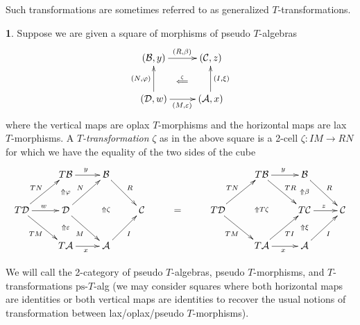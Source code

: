 \documentclass[a4paper,oneside,english]{amsart}
\numberwithin{equation}{section}
\numberwithin{figure}{section}
\theoremstyle{plain}
\theoremstyle{definition}
\newtheorem{defn}[thm]{\protect\definitionname}
\theoremstyle{remark}
\theoremstyle{definition}
\theoremstyle{plain}
\theoremstyle{plain}
\theoremstyle{plain}
\providecommand{\definitionname}{Definition}
\begin{document}
Such transformations are sometimes referred to as generalized $T$-transformations.
\begin{defn}
Suppose we are given a square of morphisms of pseudo $T$-algebras
\[
\xymatrix@=1em{\left(\mathcal{B},y\right)\ar[rr]^{\left(R,\beta\right)} &  & \left(\mathcal{C},z\right)\ar@{}[ldld]|-{\stackrel{\zeta}{\Longleftarrow}}\\
\\
\left(\mathcal{D},w\right)\ar[rr]_{\left(M,\varepsilon\right)}\ar[uu]^{\left(N,\varphi\right)} &  & \left(\mathcal{A},x\right)\ar[uu]_{\left(I,\xi\right)}
}
\]
where the vertical maps are oplax $T$-morphisms and the horizontal
maps are lax $T$-morphisms. A \emph{$T$-transformation }$\zeta$
as in the above square is a 2-cell $\zeta:IM\to RN$ for which we
have the equality of the two sides of the cube
\[
\xymatrix{ & T\mathcal{B}\ar[r]^{y}\ar@{}[d]|-{\Uparrow\varphi} & \mathcal{B}\ar[rd]^{R}\ar@{}[dd]|-{\Uparrow\zeta} &  &  &  & T\mathcal{B}\ar[r]^{y}\ar[dr]^{TR}\ar@{}[dd]|-{\Uparrow T\zeta} & \mathcal{B}\ar[rd]^{R}\ar@{}[d]|-{\Uparrow\beta}\\
T\mathcal{D}\ar[r]^{w}\ar[rd]_{TM}\ar[ru]^{TN} & \mathcal{D}\ar[rd]_{M}\ar[ru]^{N}\ar@{}[d]|-{\Uparrow\varepsilon} &  & \mathcal{C} & = & T\mathcal{D}\ar[rd]_{TM}\ar[ru]^{TN} &  & T\mathcal{C}\ar[r]^{z}\ar@{}[d]|-{\Uparrow\xi} & \mathcal{C}\\
 & T\mathcal{A}\ar[r]_{x} & \mathcal{A}\ar[ur]_{I} &  &  &  & T\mathcal{A}\ar[r]_{x}\ar[ur]_{TI} & \mathcal{A}\ar[ur]_{I}
}
\]

We will call the 2-category of pseudo $T$-algebras, pseudo $T$-morphisms,
and $T$-transformations $\text{ps}$-$T$-alg (we may consider squares
where both horizontal maps are identities or both vertical maps are
identities to recover the usual notions of transformation between
lax/oplax/pseudo $T$-morphisms). \end{defn}
\end{document}
